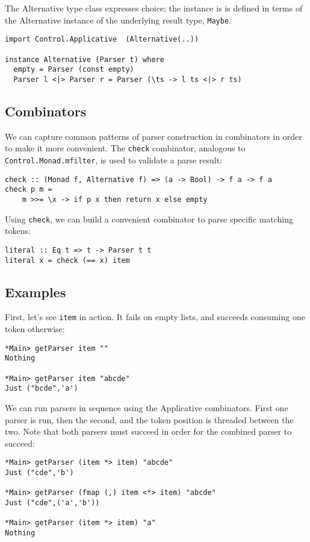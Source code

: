 \documentclass{tmr}
\begin{document}
The Alternative type class expresses choice; the instance is
is defined in terms of the Alternative instance of the
underlying result type, \verb+Maybe+.
\begin{verbatim}
import Control.Applicative  (Alternative(..))

instance Alternative (Parser t) where
  empty = Parser (const empty)
  Parser l <|> Parser r = Parser (\ts -> l ts <|> r ts)
\end{verbatim}


\subsection{Combinators}
We can capture common patterns of parser construction in combinators in 
order to make it more convenient.  The \verb+check+ combinator, analogous 
to \verb+Control.Monad.mfilter+, is used to validate a parse result:
\begin{verbatim}
check :: (Monad f, Alternative f) => (a -> Bool) -> f a -> f a
check p m =
    m >>= \x -> if p x then return x else empty
\end{verbatim}

Using \verb+check+, we can build a convenient combinator to parse specific
matching tokens: 
\begin{verbatim}
literal :: Eq t => t -> Parser t t
literal x = check (== x) item
\end{verbatim}


\subsection{Examples}
First, let's see \verb+item+ in action.  It fails on empty lists,
and succeeds consuming one token otherwise:
\begin{verbatim}
*Main> getParser item ""
Nothing

*Main> getParser item "abcde"
Just ("bcde",'a')
\end{verbatim}

We can run parsers in sequence using the Applicative combinators.  First one parser
is run, then the second, and the token position is threaded between the two.
Note that both parsers must succeed in order for the combined parser to succeed:
\begin{verbatim}
*Main> getParser (item *> item) "abcde"
Just ("cde",'b')

*Main> getParser (fmap (,) item <*> item) "abcde"
Just ("cde",('a','b'))

*Main> getParser (item *> item) "a"
Nothing
\end{verbatim}
\end{document}
